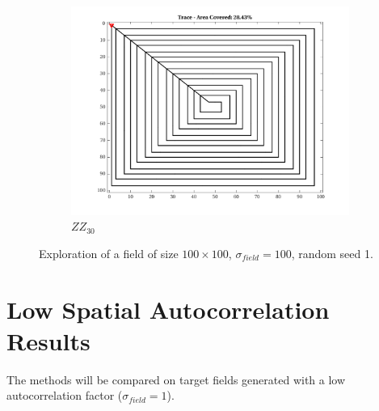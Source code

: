 \begin{figure}[htb!]
\begin{subfigure}[t]{0.25\textwidth}
        \includegraphics[width=\linewidth]{figures/path_zz_30p_100x100_sf_25_seed_1.png}
        \captionsetup{skip=0.20\baselineskip,size=footnotesize}
        \caption{$ZZ_{30}$}
    \end{subfigure}%
    \captionsetup{skip=0.20\baselineskip}
    \caption{Exploration of a field of size $100 \times 100$, $\sigma_{field} = 100$, random seed 1.}
    \label{fig:sf25}
\end{figure}

\clearpage
\section{Low Spatial Autocorrelation Results}
The methods will be compared on target fields generated with a low autocorrelation factor ($\sigma_{field}=1$).

